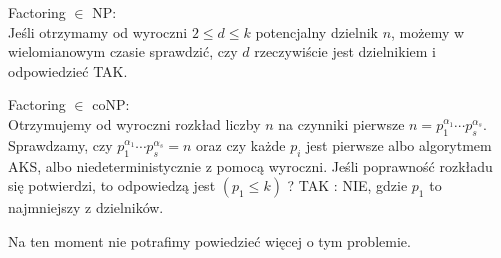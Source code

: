 Factoring \( \in \) NP: \\
Jeśli otrzymamy od wyroczni \( 2 \leq d \leq k \) potencjalny dzielnik \( n \), możemy w wielomianowym czasie sprawdzić, czy \( d \) rzeczywiście jest dzielnikiem i odpowiedzieć TAK.

Factoring \( \in \) coNP: \\
Otrzymujemy od wyroczni rozkład liczby \( n \) na czynniki pierwsze \( n = p_1^{\alpha_1} \cdots p_s^{\alpha_s} \). Sprawdzamy, czy \( p_1^{\alpha_1} \cdots p_s^{\alpha_s} = n \) oraz czy każde \( p_i \) jest pierwsze albo algorytmem AKS, albo niedeterministycznie z pomocą wyroczni. Jeśli poprawność rozkładu się potwierdzi, to odpowiedzą jest \( (p_1 \leq k) \) ? TAK : NIE, gdzie \( p_1 \) to najmniejszy z dzielników.

Na ten moment nie potrafimy powiedzieć więcej o tym problemie.
